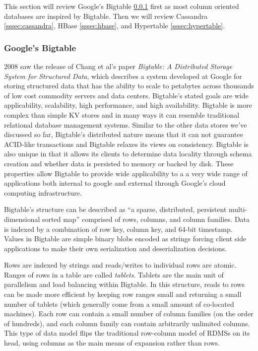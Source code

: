 \documentclass[]{article}
\begin{document}
This section will review Google's Bigtable \ref{sssec:googles-bigtable} first as most column oriented databases are inspired by Bigtable. Then we will review Cassandra \ref{sssec:cassandra}, HBase \ref{sssec:hbase}, and Hypertable \ref{sssec:hypertable}.

\subsubsection{Google's Bigtable}\label{sssec:googles-bigtable}
2008 saw the release of Chang et al's paper \textit{Bigtable: A Distributed Storage System for Structured Data}, which describes a system developed at Google for storing structured data that has the ability to scale to petabytes across thousands of low cost commodity servers and data centers. Bigtable's stated goals are wide applicability, scalability, high performance, and high availability. Bigtable is more complex than simple KV stores and in many ways it can resemble traditional relational database management systems. Similar to the other data stores we've discussed so far, Bigtable's distributed nature means that it can not guarantee ACID-like transactions and Bigtable relaxes its views on consistency. Bigtable is also unique in that it allows its clients to determine data locality through schema creation and whether data is persisted to memory or backed by disk. These properties allow Bigtable to provide wide applicability to a a very wide range of applications both internal to google and external through Google's cloud computing infrastructure.

Bigtable's structure can be described as ``a sparse, distributed, persistent multi-dimensional sorted map'' comprised of rows, columns, and column families. Data is indexed by a combination of row key, column key, and 64-bit timestamp. Values in Bigtable are simple binary blobs encoded as strings forcing client side applications to make their own serialization and deserialization decisions. 

Rows are indexed by strings and reads/writes to individual rows are atomic. Ranges of rows in a table are called \textit{tablets}. Tablets are the main unit of parallelism and load balancing within Bigtable. In this structure, reads to rows can be made more efficient by keeping row ranges small and returning a small number of tablets (which generally come from a small amount of co-located machines). Each row can contain a small number of column families (on the order of hundreds), and each column family can contain arbitrarily unlimited columns. This type of data model flips the traditional row-column model of RDMSs on its head, using columns as the main means of expansion rather than rows.
\end{document}
